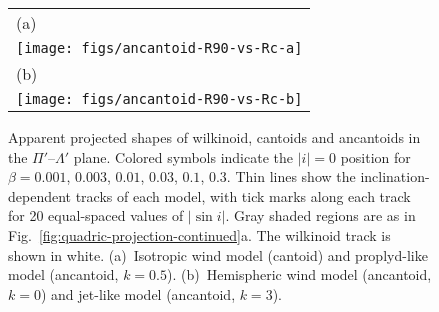 \documentclass[useAMS, usenatbib, a4paper]{mnras}
\providecommand{\abs}[1]{\lvert#1\rvert}
\begin{document}






\begin{figure}
  \centering
  \begin{tabular}{@{}l@{}}
    (a) \\
    \texttt{[image: figs/ancantoid-R90-vs-Rc-a]} \\
    (b) \\
    \texttt{[image: figs/ancantoid-R90-vs-Rc-b]}
  \end{tabular}
  \caption[]{Apparent projected shapes of wilkinoid, cantoids and
    ancantoids in the \(\Pi'\)--\(\Lambda'\) plane.  Colored symbols indicate
    the \(\abs{i} = 0\) position for \(\beta = 0.001\), \(0.003\),
    \(0.01\), \(0.03\), \(0.1\), \(0.3\).  Thin lines show the
    inclination-dependent tracks of each model, with tick marks along
    each track for 20 equal-spaced values of \(\abs{\sin i}\).  Gray
    shaded regions are as in
    Fig.~\ref{fig:quadric-projection-continued}a.  The wilkinoid track
    is shown in white. (a)~Isotropic wind model (cantoid) and
    proplyd-like model (ancantoid, \(k = 0.5\)). (b)~Hemispheric wind
    model (ancantoid, \(k = 0\)) and jet-like model (ancantoid,
    \(k = 3\)).}
  \label{fig:thin-shell-R90-Rc}
\end{figure}
\end{document}
